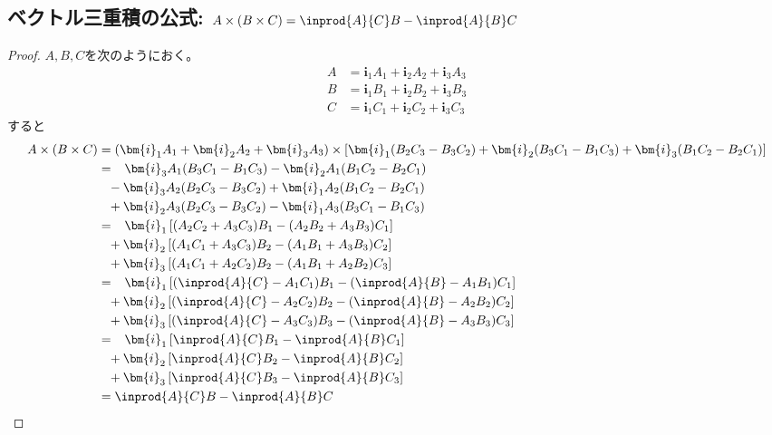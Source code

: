        \subsection{ベクトル三重積の公式: \texorpdfstring{$A\times(B\times C) = \inprod{A}{C}B - \inprod{A}{B}C$}{A×(B×C) = (A・C)B - (A・B)C}}
            \begin{proof}
                \quad\par
                $A,B,C$を次のようにおく。
                \begin{align*}
                    A &= \bm{i}_1 A_1 + \bm{i}_2 A_2 + \bm{i}_3 A_3 \\
                    B &= \bm{i}_1 B_1 + \bm{i}_2 B_2 + \bm{i}_3 B_3 \\
                    C &= \bm{i}_1 C_1 + \bm{i}_2 C_2 + \bm{i}_3 C_3
                \end{align*}
                すると
                \begin{align*}
                    A\times(B\times C) &= (\bm{i}_1 A_1 + \bm{i}_2 A_2 + \bm{i}_3 A_3) \times \left[\bm{i}_1(B_2 C_3 - B_3 C_2) + \bm{i}_2(B_3 C_1 - B_1 C_3) + \bm{i}_3(B_1 C_2 - B_2 C_1)\right] \\
                    &= \phantom{+}\bm{i}_3 A_1(B_3 C_1 - B_1 C_3) - \bm{i}_2 A_1(B_1 C_2 - B_2 C_1) \\
                    &\phantom{=} -\bm{i}_3 A_2(B_2 C_3 - B_3 C_2) + \bm{i}_1 A_2(B_1 C_2 - B_2 C_1) \\
                    &\phantom{=} +\bm{i}_2 A_3(B_2 C_3 - B_3 C_2) - \bm{i}_1 A_3(B_3 C_1 - B_1 C_3) \\
                    &= \phantom{+}\bm{i}_1 \left[(A_2 C_2 + A_3 C_3)B_1 - (A_2 B_2 + A_3 B_3)C_1\right] \\
                    &\phantom{=} + \bm{i}_2 \left[(A_1 C_1 + A_3 C_3)B_2 - (A_1 B_1 + A_3 B_3)C_2\right] \\
                    &\phantom{=} + \bm{i}_3 \left[(A_1 C_1 + A_2 C_2)B_2 - (A_1 B_1 + A_2 B_2)C_3\right] \\
                    &= \phantom{+}\bm{i}_1 \left[(\inprod{A}{C} - A_1 C_1)B_1 - (\inprod{A}{B} - A_1 B_1)C_1\right] \\
                    &\phantom{=} + \bm{i}_2 \left[(\inprod{A}{C} - A_2 C_2)B_2 - (\inprod{A}{B} - A_2 B_2)C_2\right] \\
                    &\phantom{=} + \bm{i}_3 \left[(\inprod{A}{C} - A_3 C_3)B_3 - (\inprod{A}{B} - A_3 B_3)C_3\right] \\
                    &= \phantom{+}\bm{i}_1 \left[\inprod{A}{C}B_1 - \inprod{A}{B}C_1\right] \\
                    &\phantom{=} + \bm{i}_2 \left[\inprod{A}{C}B_2 - \inprod{A}{B}C_2\right] \\
                    &\phantom{=} + \bm{i}_3 \left[\inprod{A}{C}B_3 - \inprod{A}{B}C_3\right] \\
                    &= \inprod{A}{C}B - \inprod{A}{B}C
                \end{align*}
            \end{proof}
